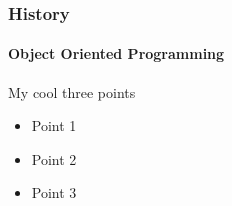 \begin{frame}[fragile,c]
    
\end{frame}

\begin{frame}[fragile,c]
    \frametitle{History}
    \framesubtitle{\textbf{O}bject \textbf{O}riented \textbf{P}rogramming}

\end{frame}

{
    \begin{frame}
    \end{frame}
}

\begin{frame}{My cool three points}
    \begin{itemize}
      \item<1-|alert@1> Point 1
      \item<3-|alert@3> Point 2
      \item<5-|alert@5> Point 3
    \end{itemize}
  \end{frame}
